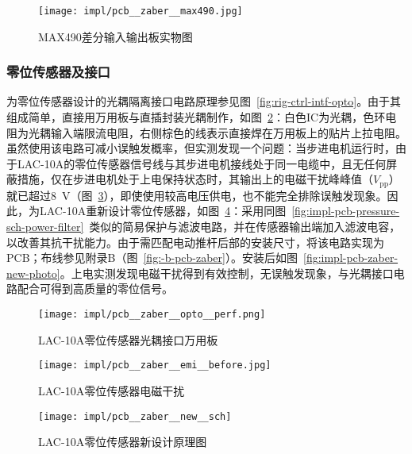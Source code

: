 \begin{figure}[tbh]
\centering
\texttt{[image: impl/pcb\_\_zaber\_\_max490.jpg]}
\caption{MAX490差分输入输出板实物图}
\label{fig:impl-pcb-zaber-max490}
\end{figure}

\subsubsection{零位传感器及接口}\label{sec:impl-pcb-zaber-homing}

为零位传感器设计的光耦隔离接口电路原理参见图~\ref{fig:rig-ctrl-intf-opto}。由于其组成简单，直接用万用板与直插封装光耦制作，如图~\ref{fig:impl-pcb-zaber-opto-perf}：白色IC为光耦，色环电阻为光耦输入端限流电阻，右侧棕色的线表示直接焊在万用板上的贴片上拉电阻。虽然使用该电路可减小误触发概率，但实测发现一个问题：当步进电机运行时，由于LAC-10A的零位传感器信号线与其步进电机接线处于同一电缆中，且无任何屏蔽措施，仅在步进电机处于上电保持状态时，其输出上的电磁干扰峰峰值（$V_{\mathrm{pp}}$）就已超过\SI{8}{\V}（图~\ref{fig:impl-pcb-zaber-emi-before}），即使使用较高电压供电，也不能完全排除误触发现象。因此，为LAC-10A重新设计零位传感器，如图~\ref{fig:impl-pcb-zaber-new-sch}：采用同图~\ref{fig:impl-pcb-pressure-sch-power-filter}~类似的简易保护与滤波电路，并在传感器输出端加入滤波电容，以改善其抗干扰能力。由于需匹配电动推杆后部的安装尺寸，将该电路实现为PCB；布线参见附录B（图~\ref{fig:-b-pcb-zaber}）。安装后如图~\ref{fig:impl-pcb-zaber-new-photo}。上电实测发现电磁干扰得到有效控制，无误触发现象，与光耦接口电路配合可得到高质量的零位信号。

\begin{figure}[tbhp]
\centering
\texttt{[image: impl/pcb\_\_zaber\_\_opto\_\_perf.png]}
\caption{LAC-10A零位传感器\csep 光耦接口\csep 万用板}
\label{fig:impl-pcb-zaber-opto-perf}
\end{figure}

\begin{figure}[tbhp]
\centering
\texttt{[image: impl/pcb\_\_zaber\_\_emi\_\_before.jpg]}
\caption{LAC-10A零位传感器\csep 电磁干扰}
\label{fig:impl-pcb-zaber-emi-before}
\end{figure}

\begin{figure}[p]
\centering
\texttt{[image: impl/pcb\_\_zaber\_\_new\_\_sch]}
\caption{LAC-10A零位传感器\csep 新设计\csep 原理图}
\label{fig:impl-pcb-zaber-new-sch}
\end{figure}

